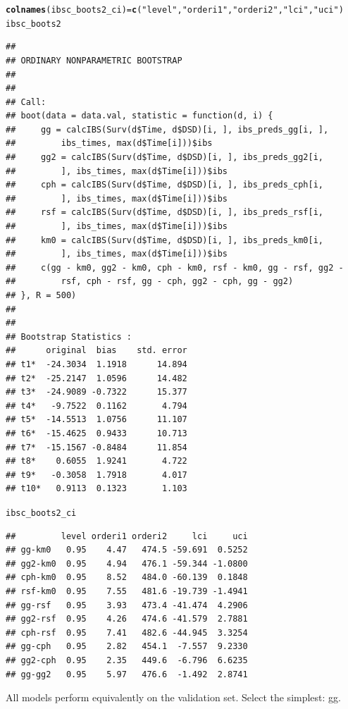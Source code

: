 \documentclass{article}\usepackage[]{graphicx}\usepackage[]{color}
\makeatletter
\newcommand{\hlstr}[1]{\textcolor[rgb]{0.192,0.494,0.8}{#1}}%
\newcommand{\hlstd}[1]{\textcolor[rgb]{0.345,0.345,0.345}{#1}}%
\newcommand{\hlkwb}[1]{\textcolor[rgb]{0.69,0.353,0.396}{#1}}%
\newcommand{\hlkwd}[1]{\textcolor[rgb]{0.737,0.353,0.396}{\textbf{#1}}}%
\newenvironment{kframe}{%
 \def\at@end@of@kframe{}%
 \ifinner\ifhmode%
  \def\at@end@of@kframe{\end{minipage}}%
  \begin{minipage}{\columnwidth}%
 \fi\fi%
 \def\FrameCommand##1{\hskip\@totalleftmargin \hskip-\fboxsep
 \colorbox{shadecolor}{##1}\hskip-\fboxsep
     \hskip-\linewidth \hskip-\@totalleftmargin \hskip\columnwidth}%
 \MakeFramed {\advance\hsize-\width
   \@totalleftmargin\z@ \linewidth\hsize
   \@setminipage}}%
 {\par\unskip\endMakeFramed%
 \at@end@of@kframe}
\newenvironment{knitrout}{}{} %
\makeatother
\begin{document}
\begin{knitrout}
\begin{kframe}
\begin{alltt}
\hlkwd{colnames}\hlstd{(ibsc_boots2_ci)} \hlkwb{=} \hlkwd{c}\hlstd{(}\hlstr{"level"}\hlstd{,} \hlstr{"orderi1"}\hlstd{,} \hlstr{"orderi2"}\hlstd{,} \hlstr{"lci"}\hlstd{,} \hlstr{"uci"}\hlstd{)}
\hlstd{ibsc_boots2}
\end{alltt}
\begin{verbatim}
## 
## ORDINARY NONPARAMETRIC BOOTSTRAP
## 
## 
## Call:
## boot(data = data.val, statistic = function(d, i) {
##     gg = calcIBS(Surv(d$Time, d$DSD)[i, ], ibs_preds_gg[i, ], 
##         ibs_times, max(d$Time[i]))$ibs
##     gg2 = calcIBS(Surv(d$Time, d$DSD)[i, ], ibs_preds_gg2[i, 
##         ], ibs_times, max(d$Time[i]))$ibs
##     cph = calcIBS(Surv(d$Time, d$DSD)[i, ], ibs_preds_cph[i, 
##         ], ibs_times, max(d$Time[i]))$ibs
##     rsf = calcIBS(Surv(d$Time, d$DSD)[i, ], ibs_preds_rsf[i, 
##         ], ibs_times, max(d$Time[i]))$ibs
##     km0 = calcIBS(Surv(d$Time, d$DSD)[i, ], ibs_preds_km0[i, 
##         ], ibs_times, max(d$Time[i]))$ibs
##     c(gg - km0, gg2 - km0, cph - km0, rsf - km0, gg - rsf, gg2 - 
##         rsf, cph - rsf, gg - cph, gg2 - cph, gg - gg2)
## }, R = 500)
## 
## 
## Bootstrap Statistics :
##      original  bias    std. error
## t1*  -24.3034  1.1918      14.894
## t2*  -25.2147  1.0596      14.482
## t3*  -24.9089 -0.7322      15.377
## t4*   -9.7522  0.1162       4.794
## t5*  -14.5513  1.0756      11.107
## t6*  -15.4625  0.9433      10.713
## t7*  -15.1567 -0.8484      11.854
## t8*    0.6055  1.9241       4.722
## t9*   -0.3058  1.7918       4.017
## t10*   0.9113  0.1323       1.103
\end{verbatim}
\begin{alltt}
\hlstd{ibsc_boots2_ci}
\end{alltt}
\begin{verbatim}
##         level orderi1 orderi2     lci     uci
## gg-km0   0.95    4.47   474.5 -59.691  0.5252
## gg2-km0  0.95    4.94   476.1 -59.344 -1.0800
## cph-km0  0.95    8.52   484.0 -60.139  0.1848
## rsf-km0  0.95    7.55   481.6 -19.739 -1.4941
## gg-rsf   0.95    3.93   473.4 -41.474  4.2906
## gg2-rsf  0.95    4.26   474.6 -41.579  2.7881
## cph-rsf  0.95    7.41   482.6 -44.945  3.3254
## gg-cph   0.95    2.82   454.1  -7.557  9.2330
## gg2-cph  0.95    2.35   449.6  -6.796  6.6235
## gg-gg2   0.95    5.97   476.6  -1.492  2.8741
\end{verbatim}
\end{kframe}
\end{knitrout}
All models perform equivalently on the validation set.  Select the simplest: gg.
\end{document}
